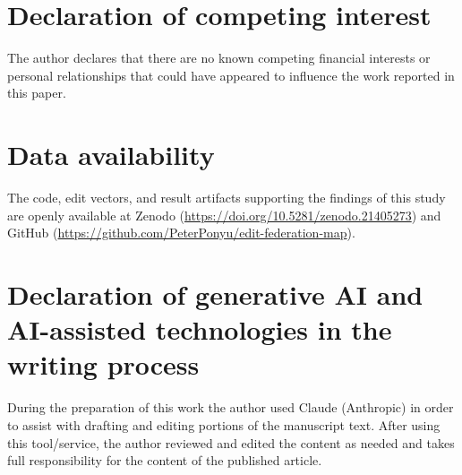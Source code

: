 \documentclass[preprint,12pt]{elsarticle}
\theoremstyle{definition}
\begin{document}
\section*{Declaration of competing interest}
The author declares that there are no known competing financial interests or personal
relationships that could have appeared to influence the work reported in this paper.

\section*{Data availability}
The code, edit vectors, and result artifacts supporting the findings of this study are
openly available at Zenodo (\url{https://doi.org/10.5281/zenodo.21405273}) and GitHub
(\url{https://github.com/PeterPonyu/edit-federation-map}).

\section*{Declaration of generative AI and AI-assisted technologies in the writing process}
During the preparation of this work the author used Claude (Anthropic) in order to
assist with drafting and editing portions of the manuscript text. After using this
tool/service, the author reviewed and edited the content as needed and takes full
responsibility for the content of the published article.



\end{document}
